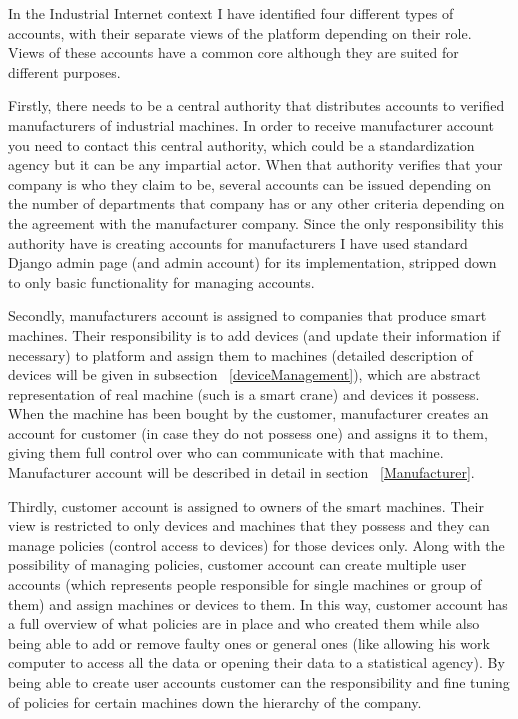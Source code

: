 In the Industrial Internet context I have identified four different types of accounts, with their separate views of the platform depending on their role. Views of these accounts have a common core although they are suited for different purposes. 

Firstly, there needs to be a central authority that distributes accounts to verified manufacturers of industrial machines. In order to receive manufacturer account you need to contact this central authority, which could be a standardization agency but it can be any impartial actor. When that authority verifies that your company is who they claim to be, several accounts can be issued depending on the number of departments that company has or any other criteria depending on the agreement with the manufacturer company. Since the only responsibility this authority have is creating accounts for manufacturers I have used standard Django admin page (and admin account) for its implementation, stripped down to only basic functionality for managing accounts.

Secondly, manufacturers account is assigned to companies that produce smart machines. Their responsibility is to add devices (and update their information if necessary) to platform and assign them to machines (detailed description of devices will be given in subsection ~\ref{deviceManagement}), which are abstract representation of real machine (such is a smart crane) and devices it possess. When the machine has been bought by the customer, manufacturer creates an account for customer (in case they do not possess one) and assigns it to them, giving them full control over who can communicate with that machine. Manufacturer account will be described in detail in section ~\ref{Manufacturer}.

Thirdly, customer account is assigned to owners of the smart machines. Their view is restricted to only devices and machines that they possess and they can manage policies (control access to devices) for those devices only. Along with the possibility of managing policies, customer account can create multiple user accounts (which represents people responsible for single machines or group of them) and assign machines or devices to them. In this way, customer account has a full overview of what policies are in place and who created them while also being able to add or remove faulty ones or general ones (like allowing his work computer to access all the data or opening their data to a statistical agency). By being able to create user accounts customer can  the responsibility and fine tuning of policies for certain machines down the hierarchy of the company.

